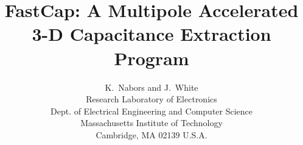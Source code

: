 \newcommand{\banner}{{\em IEEE Trans.\ on Computer Aided Design of Integrated  Cirucits and Systems}, 10(11):1447--1459, November 1991.}


\title { FastCap: A Multipole Accelerated 3-D Capacitance Extraction Program }
\author{ K.\ Nabors and J.\ White\\
Research Laboratory of Electronics\\
Dept. of Electrical Engineering and Computer Science\\
Massachusetts Institute of Technology\\
Cambridge, MA   02139   U.S.A.}
\date{\mbox{}}
\maketitle









\appendix


\newpage




